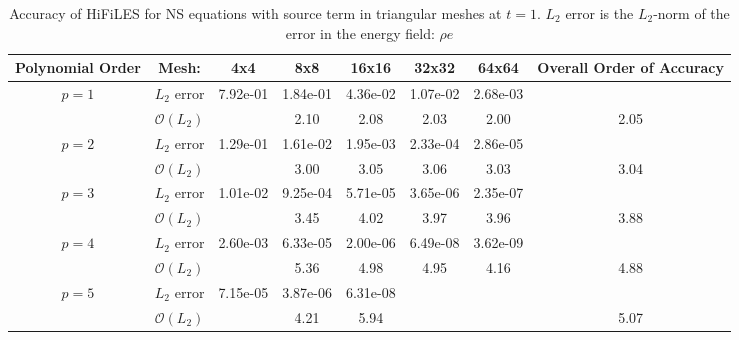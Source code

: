 \begin{table}[H]
\centering
\begin{tabular}{ c c c c c c c c} 
  
 Polynomial Order & Mesh: & 4x4 & 8x8 & 16x16 & 32x32 & 64x64 & Overall Order of Accuracy \\ 
 \hline 
 \multirow{2}{*}{$p = 1$} & $L_2$ error & 7.92e-01 & 1.84e-01 & 4.36e-02 & 1.07e-02 & 2.68e-03 &   \\ 
  
   & $\mathcal{O}(L_2)$ &   & 2.10 & 2.08 & 2.03 & 2.00 & 2.05 \\ 
 \hline 
 \multirow{2}{*}{$p = 2$} & $L_2$ error & 1.29e-01 & 1.61e-02 & 1.95e-03 & 2.33e-04 & 2.86e-05 &   \\ 
  
   & $\mathcal{O}(L_2)$ &   & 3.00 & 3.05 & 3.06 & 3.03 & 3.04 \\ 
 \hline 
 \multirow{2}{*}{$p = 3$} & $L_2$ error & 1.01e-02 & 9.25e-04 & 5.71e-05 & 3.65e-06 & 2.35e-07 &   \\ 
  
   & $\mathcal{O}(L_2)$ &   & 3.45 & 4.02 & 3.97 & 3.96 & 3.88 \\ 
 \hline 
 \multirow{2}{*}{$p = 4$} & $L_2$ error & 2.60e-03 & 6.33e-05 & 2.00e-06 & 6.49e-08 & 3.62e-09 &   \\ 
  
   & $\mathcal{O}(L_2)$ &   & 5.36 & 4.98 & 4.95 & 4.16 & 4.88 \\ 
 \hline 
 \multirow{2}{*}{$p = 5$} & $L_2$ error & 7.15e-05 & 3.87e-06 & 6.31e-08 &   &   &   \\ 
  
   & $\mathcal{O}(L_2)$ &   & 4.21 & 5.94 &   &   & 5.07 \\ 
 \hline 
 \end{tabular}
\caption{Accuracy of HiFiLES for NS equations with source term in triangular meshes at $t = 1$. $L_2$ error is the $L_2$-norm of the error in the energy field: $\rho e$}
\label{table:trisError1} 
 \end{table}
